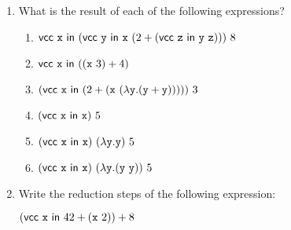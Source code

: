 \begin{enumerate}
  \item What is the result of each of the following expressions?

\begin{enumerate}
  \item $\evcc{\cx}{(\evcc{\cy}{\cx\ (2+(\evcc{\cz}{\cy\ \cz}))})\ 8}$
  \item $\textsf{vcc}\ \texttt{x}\ \textsf{in}\ ((\texttt{x}\ 3)+4)$
  \item $(\textsf{vcc}\ \texttt{x}\ \textsf{in}\ (2+(\texttt{x}\ (\lambda\texttt{y}.(\texttt{y}+\texttt{y})))))\ 3$
  \item $\eapp{\eapp{(\evcc{\cx}{\cx})}{5}}$
  \item $(\textsf{vcc}\ \texttt{x}\ \textsf{in}\ \texttt{x})\ (\lambda\texttt{y}.\texttt{y})\ 5$
  \item $(\textsf{vcc}\ \texttt{x}\ \textsf{in}\ \texttt{x})\ (\lambda\texttt{y}.(\texttt{y}\ \texttt{y}))\ 5$
\end{enumerate}

  \item Write the reduction steps of the following expression:

    $(\evcc{\cx}{42+(\cx\ 2)})+8$
\end{enumerate}
